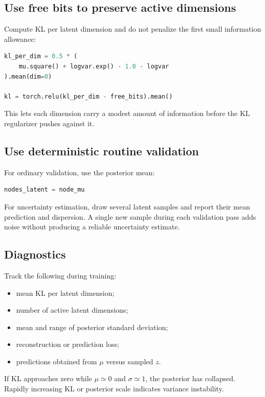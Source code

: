 \documentclass[11pt,a4paper]{article}
\begin{document}
\subsection{Use free bits to preserve active dimensions}

Compute KL per latent dimension and do not penalize the first small information
allowance:

\begin{lstlisting}[language=Python]
kl_per_dim = 0.5 * (
    mu.square() + logvar.exp() - 1.0 - logvar
).mean(dim=0)

kl = torch.relu(kl_per_dim - free_bits).mean()
\end{lstlisting}

This lets each dimension carry a modest amount of information before the KL
regularizer pushes against it.

\subsection{Use deterministic routine validation}

For ordinary validation, use the posterior mean:

\begin{lstlisting}[language=Python]
nodes_latent = node_mu
\end{lstlisting}

For uncertainty estimation, draw several latent samples and report their mean
prediction and dispersion. A single new sample during each validation pass adds
noise without producing a reliable uncertainty estimate.

\subsection{Diagnostics}

Track the following during training:

\begin{itemize}
  \item mean KL per latent dimension;
  \item number of active latent dimensions;
  \item mean and range of posterior standard deviation;
  \item reconstruction or prediction loss;
  \item predictions obtained from $\mu$ versus sampled $z$.
\end{itemize}

If KL approaches zero while $\mu\simeq0$ and $\sigma\simeq1$, the posterior has
collapsed. Rapidly increasing KL or posterior scale indicates variance
instability.
\end{document}
